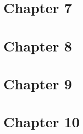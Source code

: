 \documentclass[12pt]{article}
\begin{document}
\section*{Chapter 7}

\section*{Chapter 8}

\section*{Chapter 9}

\section*{Chapter 10}
\end{document}
